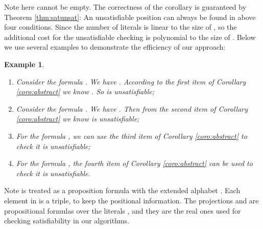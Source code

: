 \documentclass[conference]{IEEEtran}
\newtheorem{corollary}{Corollary}
\newtheorem{example}{Example}
\begin{document}
\iffalse
\begin{corollary}\label{coro:abstract}
  Given an LTL formula  and let , then  is unsatisfiable if one of the following conditions is true:
  \begin{enumerate}
    \item There exists  such that , and ;
    \item ;
    \item There exists  such that , and 
    , where  and  for each 
    ;
    \item There exists  such that , and 
    ;
  \end{enumerate}
\end{corollary}
\fi

Note here  cannot be empty. The correctness of the corollary is
guaranteed by Theorem \ref{thm:satunsat}: An unsatisfiable position
can always be found in above four conditions. Since the number of
literals is linear to the size of , so the additional cost for
the unsatisfiable checking is polynomial to the size of . Below
we use several examples to demonstrate the efficiency of our approach:

\begin{example}
  \begin{enumerate}
  \item Consider the formula . We have
    . According to the first item of Corollary
    \ref{coro:abstract} we know . So  is unsatisfiable;
  \item Consider the formula . We
    have . Then from the
    second item of Corollary \ref{coro:abstract} we know  is
    unsatisfiable;
    \item For the formula , we can use the third item of Corollary 
    \ref{coro:abstract} to check it is unsatisfiable;
    \item For the formula , the fourth item of Corollary 
    \ref{coro:abstract} can be used to check it is unsatisfiable.
  \end{enumerate}
\iffalse
  Consider the pattern formula 
  , apply our approach and we get , in which . Then according to the second strategy in Corollary \ref{coro:abstract} we can conclude 
   is unsatisfiable due to . As a result, the checking result is 
  benefit from the high performance of SAT solvers.
\fi
\end{example}

Note  is treated as a proposition formula with the
extended alphabet . Each element  in  is
a triple, to keep the positional information. The projections
 and  are
propositional formulas over the literals , and they are the real ones used
for checking satisfiability in our algorithms.
\end{document}
